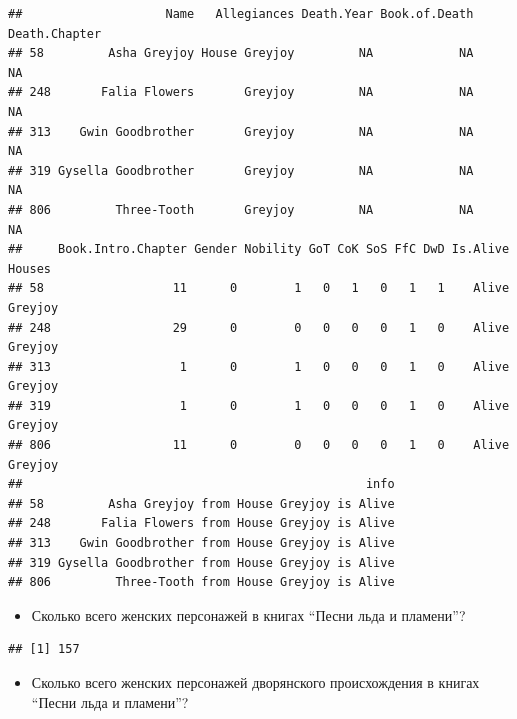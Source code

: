 \documentclass[]{book}
\newenvironment{Shaded}{\begin{snugshade}}{\end{snugshade}}
\newcommand{\KeywordTok}[1]{\textcolor[rgb]{0.13,0.29,0.53}{\textbf{#1}}}
\newcommand{\DecValTok}[1]{\textcolor[rgb]{0.00,0.00,0.81}{#1}}
\newcommand{\StringTok}[1]{\textcolor[rgb]{0.31,0.60,0.02}{#1}}
\newcommand{\OperatorTok}[1]{\textcolor[rgb]{0.81,0.36,0.00}{\textbf{#1}}}
\newcommand{\NormalTok}[1]{#1}
\providecommand{\tightlist}{%
  \setlength{\itemsep}{0pt}\setlength{\parskip}{0pt}}
\begin{document}
\begin{verbatim}
##                    Name   Allegiances Death.Year Book.of.Death Death.Chapter
## 58         Asha Greyjoy House Greyjoy         NA            NA            NA
## 248       Falia Flowers       Greyjoy         NA            NA            NA
## 313    Gwin Goodbrother       Greyjoy         NA            NA            NA
## 319 Gysella Goodbrother       Greyjoy         NA            NA            NA
## 806         Three-Tooth       Greyjoy         NA            NA            NA
##     Book.Intro.Chapter Gender Nobility GoT CoK SoS FfC DwD Is.Alive  Houses
## 58                  11      0        1   0   1   0   1   1    Alive Greyjoy
## 248                 29      0        0   0   0   0   1   0    Alive Greyjoy
## 313                  1      0        1   0   0   0   1   0    Alive Greyjoy
## 319                  1      0        1   0   0   0   1   0    Alive Greyjoy
## 806                 11      0        0   0   0   0   1   0    Alive Greyjoy
##                                                info
## 58         Asha Greyjoy from House Greyjoy is Alive
## 248       Falia Flowers from House Greyjoy is Alive
## 313    Gwin Goodbrother from House Greyjoy is Alive
## 319 Gysella Goodbrother from House Greyjoy is Alive
## 806         Three-Tooth from House Greyjoy is Alive
\end{verbatim}

\begin{itemize}
\tightlist
\item
  Сколько всего женских персонажей в книгах ``Песни льда и пламени''?
\end{itemize}

\begin{Shaded}
\end{Shaded}

\begin{verbatim}
## [1] 157
\end{verbatim}

\begin{itemize}
\tightlist
\item
  Сколько всего женских персонажей дворянского происхождения в книгах
  ``Песни льда и пламени''?
\end{itemize}

\begin{Shaded}
\end{Shaded}
\end{document}
